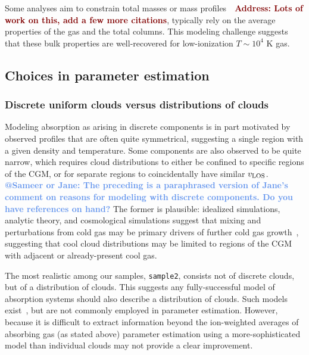 \documentclass[fleqn,usenatbib]{mnras}
\makeatletter
\newcommand{\todo}[1]{\textcolor{Maroon}{\textbf{Address: #1}}}
\newcommand{\atsameer}[1]{\textcolor{CornflowerBlue}{\textbf{@Sameer or Jane: #1}}}
\makeatother
\begin{document}
Some analyses aim to constrain total masses or mass profiles~\citep[e.g.][]{Zahedy2019a}~\todo{Lots of work on this, add a few more citations}, typically rely on the average properties of the gas and the total columns.
This modeling challenge suggests that these bulk properties are well-recovered for low-ionization $T \sim 10^4$ K gas.

\subsection{Choices in parameter estimation}

\subsubsection{Discrete uniform clouds versus distributions of clouds}

Modeling absorption as arising in discrete components is in part motivated by observed profiles that are often quite symmetrical,
suggesting a single region with a given density and temperature. 
Some components are also observed to be quite narrow, 
which requires cloud distributions to either be confined to specific regions of the CGM,
or for separate regions to coincidentally have similar $v_{\rm LOS}$.
\atsameer{The preceding is a paraphrased version of Jane's comment on reasons for modeling with discrete components. Do you have references on hand?}
The former is plausible:
idealized simulations, analytic theory, and cosmological simulations suggest that mixing and perturbations from cold gas may be primary drivers of further cold gas growth~\citep[e.g.][]{esmerian2021Thermal, gronke2021Survival, gronke2022Cooling},
suggesting that cool cloud distributions may be limited to regions of the CGM with adjacent or already-present cool gas.

The most realistic among our samples, \texttt{sample2}, consists not of discrete clouds, but of a distribution of clouds.
This suggests any fully-successful model of absorption systems should also describe a distribution of clouds.
Such models exist~\citep[e.g.][]{stern2016Universal}, but are not commonly employed in parameter estimation.
However, because it is difficult to extract information beyond the ion-weighted averages of absorbing gas (as stated above) parameter estimation using a more-sophisticated model than individual clouds may not provide a clear improvement.
\end{document}
